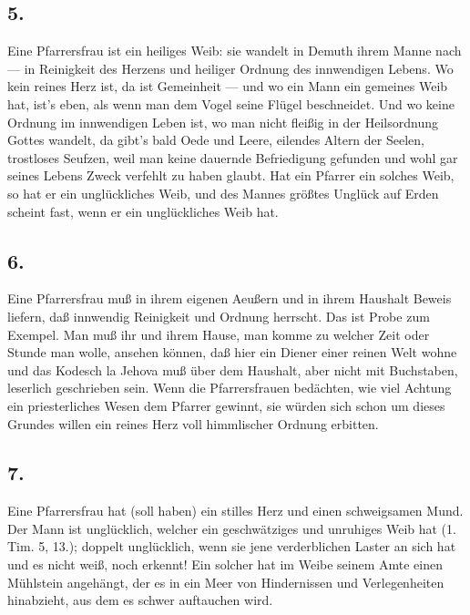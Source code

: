\subsection{5.}

Eine Pfarrersfrau ist ein heiliges Weib: sie wandelt in Demuth ihrem Manne nach — in Reinigkeit des Herzens und heiliger Ordnung des innwendigen Lebens. Wo kein reines Herz ist, da ist Gemeinheit — und wo ein Mann ein gemeines Weib hat, ist’s eben, als wenn man dem Vogel seine Flügel beschneidet. Und wo keine Ordnung im innwendigen Leben ist, wo man nicht fleißig in der Heilsordnung Gottes wandelt, da gibt’s bald Oede und Leere, eilendes Altern der Seelen, trostloses Seufzen, weil man keine dauernde Befriedigung gefunden und wohl gar seines Lebens Zweck verfehlt zu haben glaubt. Hat ein Pfarrer ein solches Weib, so hat er ein unglückliches Weib, und des Mannes größtes Unglück auf Erden scheint fast, wenn er ein unglückliches Weib hat.

\subsection{6.}

Eine Pfarrersfrau muß in ihrem eigenen Aeußern und in ihrem Haushalt Beweis liefern, daß innwendig Reinigkeit und Ordnung herrscht. Das ist Probe zum Exempel. Man muß ihr und ihrem Hause, man komme zu welcher Zeit oder Stunde man wolle, ansehen können, daß hier ein Diener einer reinen Welt wohne und das Kodesch la Jehova
muß über dem Haushalt, aber nicht mit Buchstaben, leserlich geschrieben sein. Wenn die Pfarrersfrauen bedächten, wie viel Achtung ein priesterliches Wesen dem Pfarrer gewinnt, sie würden sich schon um dieses Grundes willen ein reines Herz voll himmlischer Ordnung erbitten.

\subsection{7.}

Eine Pfarrersfrau hat (soll haben) ein stilles Herz und einen schweigsamen Mund. Der Mann ist unglücklich, welcher ein geschwätziges und unruhiges Weib hat (1. Tim. 5, 13.); doppelt unglücklich, wenn sie jene verderblichen Laster an sich hat und es nicht weiß, noch erkennt! Ein solcher hat im Weibe seinem Amte einen Mühlstein angehängt, der es in ein Meer von Hindernissen und Verlegenheiten hinabzieht, aus dem es schwer auftauchen wird.

